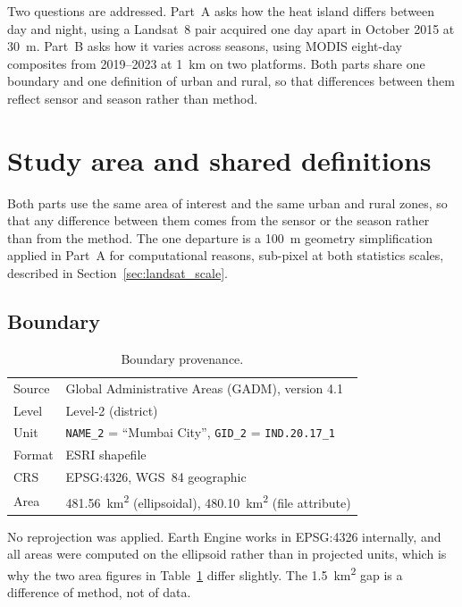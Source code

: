 \documentclass[11pt,a4paper]{article}
\begin{document}
Two questions are addressed. Part~A asks how the heat island differs
between day and night, using a Landsat~8 pair acquired one day apart in
October 2015 at \SI{30}{\metre}. Part~B asks how it varies across
seasons, using MODIS eight-day composites from 2019--2023 at
\SI{1}{\kilo\metre} on two platforms. Both parts share one boundary and
one definition of urban and rural, so that differences between them
reflect sensor and season rather than method.

\section{Study area and shared definitions}
\label{sec:studyarea}

Both parts use the same area of interest and the same urban and rural
zones, so that any difference between them comes from the sensor or
the season rather than from the method. The one departure is a
\SI{100}{\metre} geometry simplification applied in Part~A for
computational reasons, sub-pixel at both statistics scales, described
in Section~\ref{sec:landsat_scale}.

\subsection{Boundary}

\begin{table}[htbp]
\centering
\begin{tabular}{ll}
\toprule
Source & Global Administrative Areas (GADM), version 4.1 \\
Level  & Level-2 (district) \\
Unit   & \texttt{NAME\_2} = ``Mumbai City'',
         \texttt{GID\_2} = \texttt{IND.20.17\_1} \\
Format & ESRI shapefile \\
CRS    & EPSG:4326, WGS~84 geographic \\
Area   & \SI{481.56}{\kilo\metre\squared} (ellipsoidal),
         \SI{480.10}{\kilo\metre\squared} (file attribute) \\
\bottomrule
\end{tabular}
\caption{Boundary provenance.}
\label{tab:boundary}
\end{table}

No reprojection was applied. Earth Engine works in EPSG:4326
internally, and all areas were computed on the ellipsoid rather than
in projected units, which is why the two area figures in
Table~\ref{tab:boundary} differ slightly. The
\SI{1.5}{\kilo\metre\squared} gap is a difference of method, not of
data.
\end{document}
